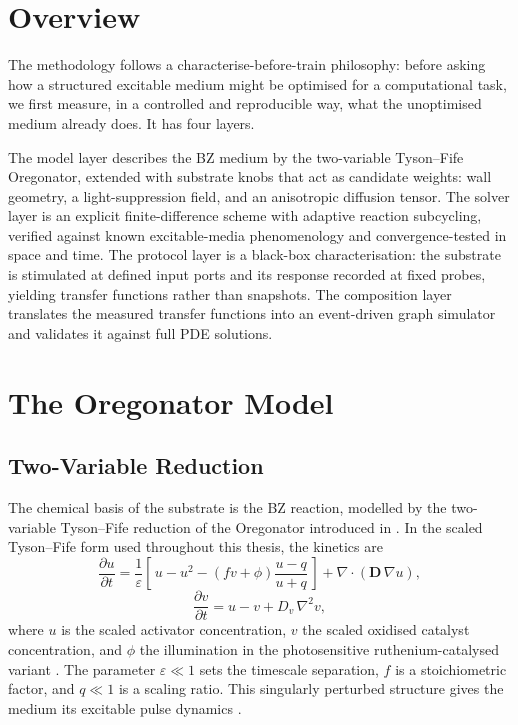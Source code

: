 
\section{Overview}
\label{sec:meth_overview}

The methodology follows a characterise-before-train philosophy: before asking how a structured excitable medium might be optimised for a computational task, we first measure, in a controlled and reproducible way, what the unoptimised medium already does.
It has four layers.

The model layer describes the BZ medium by the two-variable Tyson--Fife Oregonator, extended with substrate knobs that act as candidate weights: wall geometry, a light-suppression field, and an anisotropic diffusion tensor.
The solver layer is an explicit finite-difference scheme with adaptive reaction subcycling, verified against known excitable-media phenomenology and convergence-tested in space and time.
The protocol layer is a black-box characterisation: the substrate is stimulated at defined input ports and its response recorded at fixed probes, yielding transfer functions rather than snapshots.
The composition layer translates the measured transfer functions into an event-driven graph simulator and validates it against full PDE solutions.

\section{The Oregonator Model}
\label{sec:meth_oregonator}

\subsection{Two-Variable Reduction}
\label{sec:meth_oregonator_2var}

The chemical basis of the substrate is the BZ reaction, modelled by the two-variable Tyson--Fife reduction of the Oregonator introduced in  \cite{field1974oregonator, tyson1980target}.
In the scaled Tyson--Fife form used throughout this thesis, the kinetics are
\begin{equation}
\frac{\partial u}{\partial t} = \frac{1}{\varepsilon}\left[\,u - u^{2} - \left(f v + \phi\right)\frac{u - q}{u + q}\,\right] + \nabla\!\cdot\!\left(\mathbf{D}\,\nabla u\right),
\label{eq:oregonator_u}
\end{equation}
\begin{equation}
\frac{\partial v}{\partial t} = u - v + D_{v}\,\nabla^{2} v,
\label{eq:oregonator_v}
\end{equation}
where $u$ is the scaled activator concentration, $v$ the scaled oxidised catalyst concentration, and $\phi$ the illumination in the photosensitive ruthenium-catalysed variant \cite{sakurai2002design}.
The parameter $\varepsilon \ll 1$ sets the timescale separation, $f$ is a stoichiometric factor, and $q \ll 1$ is a scaling ratio.
This singularly perturbed structure gives the medium its excitable pulse dynamics \cite{tyson1988singular}.

